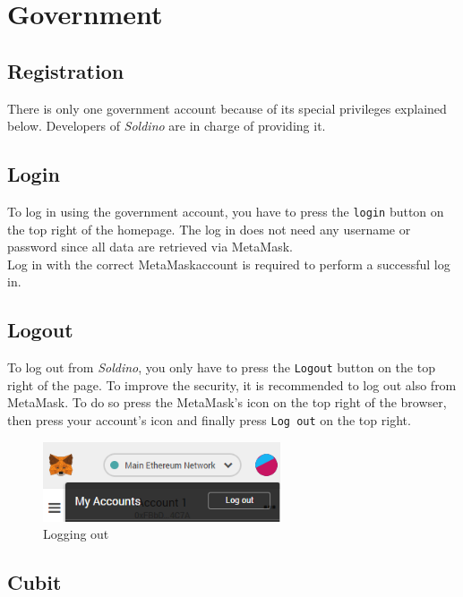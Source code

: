 \section{Government}
	\subsection{Registration}
	There is only one government account because of its special privileges
	explained below. Developers of \textit{Soldino} are in charge of providing
	it.
	\subsection{Login}
	To log in using the government account, you have to press the \texttt{login}
	button on the top right of the homepage. The log in does not need any
	username or password since all data are retrieved via MetaMask.
	\\Log in with the correct MetaMask\glosp account is required to perform a
	successful log in.
	\subsection{Logout}

	To log out from \textit{Soldino}, you only have to press the \texttt{Logout}
	button on the top right of the page. To improve the security, it is
	recommended to log out also from MetaMask\glosp{}. To do so press the
	MetaMask's icon on the top right of the browser, then press your account's
	icon and finally press \texttt{Log out} on the top right.
	\begin{figure}[H]
		\includegraphics[width=7cm]{res/images/logout_metamask.png}
		\centering
		\caption{Logging out}
	\end{figure}
\pagebreak
	\subsection{Cubit}

